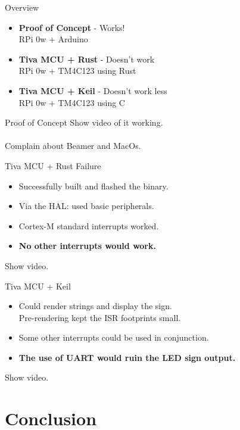 \documentclass[10pt]{beamer}
\begin{document}
\begin{frame}{Overview}
  \Large
  \begin{itemize}
    \item \textbf{Proof of Concept} \-- Works!\\
      RPi 0w + Arduino
    \item \textbf{Tiva MCU + Rust} \-- Doesn't work\\
      RPi 0w + TM4C123 using Rust
    \item \textbf{Tiva MCU + Keil} \-- Doesn't work less\\
      RPi 0w + TM4C123 using C
  \end{itemize}
\end{frame}

\begin{frame}{Proof of Concept}
  \huge Show video of it working. \\ \\
  \small Complain about Beamer and MacOs.
\end{frame}

\begin{frame}{Tiva MCU + Rust}
  \huge Failure\\
  \Large
  \begin{itemize}
    \item Successfully built and flashed the binary.
    \item Via the HAL\@: used basic peripherals.
    \item Cortex-M standard interrupts worked.
    \item \textbf{No other interrupts would work.}
  \end{itemize}
  \huge Show video.
\end{frame}

\begin{frame}{Tiva MCU + Keil}
  \Large
  \begin{itemize}
    \item Could render strings and display the sign.\\
      \large Pre-rendering kept the ISR footprints small.
    \item Some other interrupts could be used in conjunction.
    \item \textbf{The use of UART would ruin the LED sign output.}
  \end{itemize}
  \huge Show video.
\end{frame}

\section{Conclusion}
\end{document}
